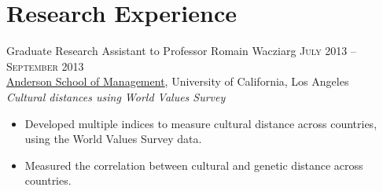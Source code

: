 \documentclass[11pt]{article}
\begin{document}
\section{Research Experience}
\label{sec-2}

\flushleft
Graduate Research Assistant to Professor Romain Wacziarg \hfill
\textsc{\normalsize July 2013 -- September 2013}\\
\href{http://www.anderson.ucla.edu/faculty/global-economics-and-management/phd-program}{Anderson School of Management}, University of California, Los Angeles \\
\emph{Cultural distances using World Values Survey}
\begin{itemize}
\item Developed multiple indices to measure cultural distance across countries, using the World Values Survey data.
\item Measured the correlation between cultural and genetic distance across countries.
\end{itemize}

\vspace{0.5em}
\end{document}
